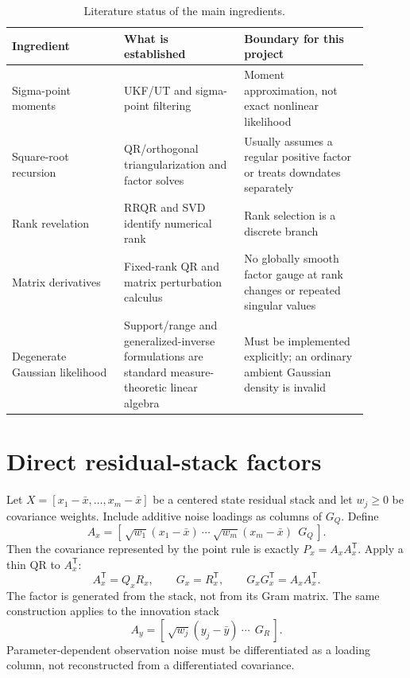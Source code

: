 \documentclass[11pt]{article}
\newcommand{\transpose}{^{\mathsf T}}
\begin{document}
\begin{table}[ht]
\centering
\caption{Literature status of the main ingredients.}
\label{tab:literature-status}
\begin{tabular}{p{0.28\linewidth}p{0.30\linewidth}p{0.31\linewidth}}
\toprule
Ingredient & What is established & Boundary for this project \\
\midrule
Sigma-point moments & UKF/UT and sigma-point filtering
  \cite{julieruhlmann1997,julieruhlmann2004,vandermerwe2004} & Moment approximation,
  not exact nonlinear likelihood \\
Square-root recursion & QR/orthogonal triangularization and factor solves
  \cite{kaminski1971,bierman1977,vandermerwewan2001,arasaratnamhaykin2009} & Usually
  assumes a regular positive factor or treats downdates separately \\
Rank revelation & RRQR and SVD identify numerical rank
  \cite{chan1987,gu1996,golubvanloan2013} & Rank selection is a discrete branch \\
Matrix derivatives & Fixed-rank QR and matrix perturbation calculus
  \cite{magnusneudecker1999,stewartsun1990,ionescu2015} & No globally smooth factor gauge at
  rank changes or repeated singular values \\
Degenerate Gaussian likelihood & Support/range and generalized-inverse
  formulations are standard measure-theoretic linear algebra
  \cite{bogachev1998,benisraelgreville2003} & Must be implemented explicitly; an ordinary
  ambient Gaussian density is invalid \\
\bottomrule
\end{tabular}
\end{table}

\section{Direct residual-stack factors}

Let $X=[x_1-\bar x,\ldots,x_m-\bar x]$ be a centered state residual stack and
let $w_j\geq0$ be covariance weights.  Include additive noise loadings as
columns of $G_Q$.  Define
\begin{equation}
 A_x=[\,\sqrt{w_1}(x_1-\bar x)\ \cdots\ \sqrt{w_m}(x_m-\bar x)\ \ G_Q\,].
 \label{eq:state-stack}
\end{equation}
Then the covariance represented by the point rule is exactly
$P_x=A_xA_x\transpose$.  Apply a thin QR to $A_x\transpose$:
\begin{equation}
 A_x\transpose=Q_xR_x,\qquad G_x=R_x\transpose,
 \qquad G_xG_x\transpose=A_xA_x\transpose.
 \label{eq:prediction-qr}
\end{equation}
The factor is generated from the stack, not from its Gram matrix.  The same
construction applies to the innovation stack
\begin{equation}
 A_y=[\,\sqrt{w_j}(y_j-\bar y)\ \cdots\ \ G_R\,].
 \label{eq:innovation-stack}
\end{equation}
Parameter-dependent observation noise must be differentiated as a loading
column, not reconstructed from a differentiated covariance.
\end{document}
